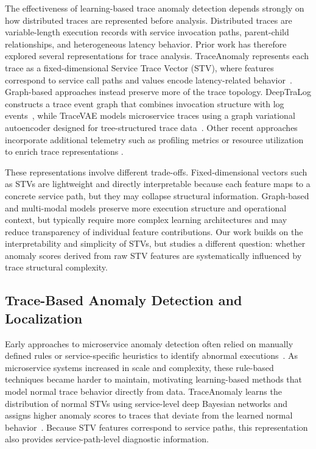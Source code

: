 \documentclass[informatics,article,submit,moreauthors]{Definitions/mdpi}
\begin{document}
The effectiveness of learning-based trace anomaly detection depends
strongly on how distributed traces are represented before analysis.
Distributed traces are variable-length execution records with service
invocation paths, parent-child relationships, and heterogeneous latency
behavior. Prior work has therefore explored several representations for
trace analysis. TraceAnomaly represents each trace as a fixed-dimensional
Service Trace Vector (STV), where features correspond to service call
paths and values encode latency-related behavior~\cite{liu2020traceanomaly}.
Graph-based approaches instead preserve more of the trace topology.
DeepTraLog constructs a trace event graph that combines invocation
structure with log events~\cite{zhang2022deeptralog, barata2026anomaly}, while TraceVAE
models microservice traces using a graph variational autoencoder
designed for tree-structured trace data~\cite{xie2023tracevae}. Other
recent approaches incorporate additional telemetry such as profiling
metrics or resource utilization to enrich trace representations
\cite{panahandeh2024serviceanomaly,alomari2025contextaware}.

These representations involve different trade-offs. Fixed-dimensional
vectors such as STVs are lightweight and directly interpretable because
each feature maps to a concrete service path, but they may collapse
structural information. Graph-based and multi-modal models preserve more
execution structure and operational context, but typically require more
complex learning architectures and may reduce transparency of individual
feature contributions. Our work builds on the interpretability and
simplicity of STVs, but studies a different question: whether anomaly
scores derived from raw STV features are systematically influenced by
trace structural complexity.

\subsection{Trace-Based Anomaly Detection and Localization}

Early approaches to microservice anomaly detection often relied on
manually defined rules or service-specific heuristics to identify
abnormal executions~\cite{liu2020traceanomaly, khanahmadi2023detection}. As microservice systems
increased in scale and complexity, these rule-based techniques became
harder to maintain, motivating learning-based methods that model normal
trace behavior directly from data. TraceAnomaly learns the distribution
of normal STVs using service-level deep Bayesian networks and assigns
higher anomaly scores to traces that deviate from the learned normal
behavior~\cite{liu2020traceanomaly}. Because STV features correspond to
service paths, this representation also provides service-path-level
diagnostic information.
\end{document}
